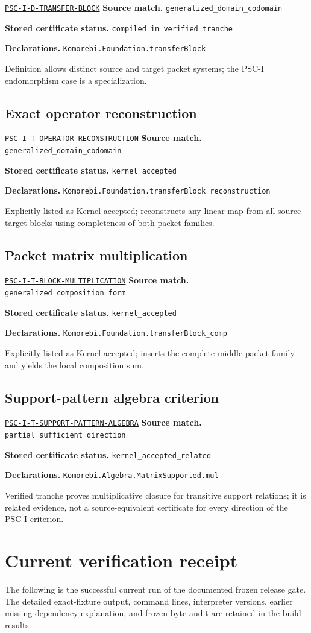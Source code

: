 \documentclass[a4paper,11pt]{article}
\newcommand{\field}[2]{\noindent\textbf{#1.} #2\par}
\begin{document}
\hyperref[rec:PSC-I-D-TRANSFER-BLOCK]{\nolinkurl{PSC-I-D-TRANSFER-BLOCK}}
\field{Source match}{\nolinkurl{generalized_domain_codomain}}
\field{Stored certificate status}{\nolinkurl{compiled_in_verified_tranche}}
\field{Declarations}{\nolinkurl{Komorebi.Foundation.transferBlock}}
Definition allows distinct source and target packet systems; the PSC-I endomorphism case is a specialization.
\subsection*{Exact operator reconstruction}
\hyperref[rec:PSC-I-T-OPERATOR-RECONSTRUCTION]{\nolinkurl{PSC-I-T-OPERATOR-RECONSTRUCTION}}
\field{Source match}{\nolinkurl{generalized_domain_codomain}}
\field{Stored certificate status}{\nolinkurl{kernel_accepted}}
\field{Declarations}{\nolinkurl{Komorebi.Foundation.transferBlock_reconstruction}}
Explicitly listed as Kernel accepted; reconstructs any linear map from all source-target blocks using completeness of both packet families.
\subsection*{Packet matrix multiplication}
\hyperref[rec:PSC-I-T-BLOCK-MULTIPLICATION]{\nolinkurl{PSC-I-T-BLOCK-MULTIPLICATION}}
\field{Source match}{\nolinkurl{generalized_composition_form}}
\field{Stored certificate status}{\nolinkurl{kernel_accepted}}
\field{Declarations}{\nolinkurl{Komorebi.Foundation.transferBlock_comp}}
Explicitly listed as Kernel accepted; inserts the complete middle packet family and yields the local composition sum.
\subsection*{Support-pattern algebra criterion}
\hyperref[rec:PSC-I-T-SUPPORT-PATTERN-ALGEBRA]{\nolinkurl{PSC-I-T-SUPPORT-PATTERN-ALGEBRA}}
\field{Source match}{\nolinkurl{partial_sufficient_direction}}
\field{Stored certificate status}{\nolinkurl{kernel_accepted_related}}
\field{Declarations}{\nolinkurl{Komorebi.Algebra.MatrixSupported.mul}}
Verified tranche proves multiplicative closure for transitive support relations; it is related evidence, not a source-equivalent certificate for every direction of the PSC-I criterion.
\clearpage\section{Current verification receipt}
The following is the successful current run of the documented frozen release gate. The detailed exact-fixture output, command lines, interpreter versions, earlier missing-dependency explanation, and frozen-byte audit are retained in the build results.
\end{document}
